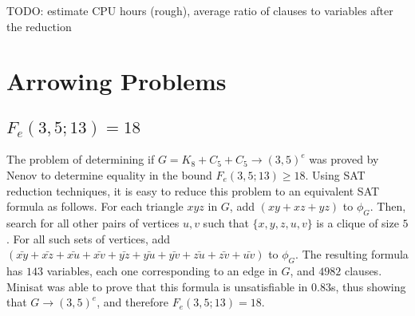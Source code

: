 \documentclass[paper=a4, fontsize=11pt]{scrartcl} %
\newcommand{\TODO}{{\color{red}TODO}}
\begin{document}
\TODO: estimate CPU hours (rough), average ratio of clauses to variables after the reduction

\section{Arrowing Problems}
\label{sec:arrowComputations}
\subsection{$F_e(3,5;13) = 18$}
The problem of determining if $G = K_8 + C_5 + C_5 \to (3,5)^e$ was proved by Nenov \cite{Nenov83-1}
to determine equality in the bound $F_e(3,5;13) \geq 18$. Using SAT reduction techniques, it is easy to
reduce this problem to an equivalent SAT formula as follows. For each triangle $xyz$ in $G$, add
$(xy + xz + yz)$ to $\phi_G$. Then, search for all other pairs of vertices $u,v$ such that $\{x,y,z,u,v\}$ is a clique
of size $5$. For all such sets of vertices, add $(\bar{xy} + \bar{xz} + \bar{xu} + \bar{xv} + \bar{yz} + \bar{yu} + \bar{yv} + \bar{zu} + \bar{zv} + \bar{uv})$
to $\phi_G$. The resulting formula has $143$ variables, each one corresponding to an edge in $G$,
and $4982$ clauses. Minisat was able to prove that this formula is unsatisfiable in 0.83s, thus
showing that $G \to (3,5)^e$, and therefore $F_e(3,5;13) = 18$.

\end{document}
